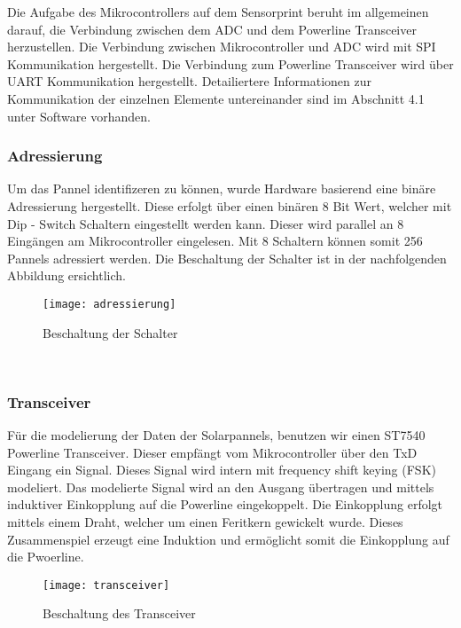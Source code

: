 Die Aufgabe des Mikrocontrollers auf dem Sensorprint beruht im allgemeinen darauf, die Verbindung zwischen dem ADC und dem Powerline Transceiver herzustellen. Die Verbindung zwischen Mikrocontroller und ADC wird mit SPI Kommunikation hergestellt. Die Verbindung zum Powerline Transceiver wird über UART Kommunikation hergestellt. Detailiertere Informationen zur Kommunikation der einzelnen Elemente untereinander sind im Abschnitt 4.1 unter Software vorhanden.


\clearpage

\subsubsection{Adressierung}
Um das Pannel identifizeren zu können, wurde Hardware basierend eine binäre Adressierung hergestellt. Diese erfolgt über einen binären 8 Bit Wert, welcher mit Dip - Switch Schaltern eingestellt werden kann. Dieser wird parallel an 8 Eingängen am Mikrocontroller eingelesen. Mit 8 Schaltern können somit 256 Pannels adressiert werden. Die Beschaltung der Schalter ist in der nachfolgenden Abbildung ersichtlich.

\begin{figure}[h]
\centering
\texttt{[image: adressierung]}
\caption{Beschaltung der Schalter}
\end{figure}

\
\

\subsubsection{Transceiver}
Für die modelierung der Daten der Solarpannels, benutzen wir einen ST7540 Powerline Transceiver. Dieser empfängt vom Mikrocontroller über den TxD Eingang ein Signal. Dieses Signal wird intern mit frequency shift keying (FSK) modeliert. Das modelierte Signal wird an den Ausgang übertragen und mittels induktiver Einkopplung auf die Powerline eingekoppelt. Die Einkopplung erfolgt mittels einem Draht, welcher um einen Feritkern gewickelt wurde. Dieses Zusammenspiel erzeugt eine Induktion und ermöglicht somit die Einkopplung auf die Pwoerline.

\clearpage

\begin{figure}[h]
\centering
\texttt{[image: transceiver]}
\caption{Beschaltung des Transceiver}
\end{figure}



